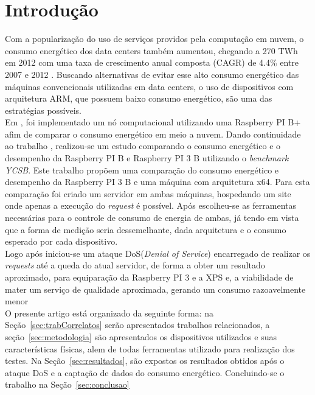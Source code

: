 \documentclass[12pt]{article}
\begin{document}
\section{Introdução}
  Com a popularização do uso de serviços providos pela computação em nuvem, o consumo energético dos data centers também aumentou, chegando a 270 TWh em 2012 com uma taxa de crescimento anual composta (CAGR) de 4.4\% entre 2007 e 2012 \cite{VanHeddeghem:2014:TWI:2657027.2657141}. Buscando alternativas de evitar esse alto consumo energético das máquinas convencionais utilizadas em data centers, o uso de dispositivos com arquitetura ARM, que possuem baixo consumo energético, são uma das estratégias possíveis.\\  
  Em \cite{Joao}, foi implementado um nó computacional utilizando uma Raspberry PI B+ afim de comparar o consumo energético em meio a nuvem.
  Dando continuidade ao trabalho \cite{eu}, realizou-se um estudo comparando o consumo energético e o desempenho da Raspberry PI B e Raspberry PI 3 B utilizando o \textit{benchmark YCSB}. Este trabalho propõem uma comparação do consumo energético e desempenho da Raspberry PI 3 B e uma máquina com arquitetura x64. Para esta comparação foi criado um servidor em ambas máquinas, hospedando um site onde apenas a execução do \textit{request} é possível. Após escolheu-se as ferramentas necessárias para o controle de consumo de energia de ambas, já tendo em vista que a forma de medição seria dessemelhante, dada arquitetura e o consumo esperado por cada dispositivo.\\
  Logo após iniciou-se um ataque DoS(\textit{Denial of Service}) encarregado de realizar os \textit{requests} até a queda do atual servidor, de forma a obter um resultado aproximado, para equiparação da Raspberry PI 3 e a XPS e, a viabilidade de mater um serviço de qualidade aproximada, gerando um consumo razoavelmente menor\\
  O presente artigo está organizado da seguinte forma: na Seção~\ref{sec:trabCorrelatos} serão apresentados trabalhos relacionados, a seção~\ref{sec:metodologia} são apresentados os dispositivos utilizados e suas características físicas, alem de todas ferramentas utilizado para realização dos testes. Na Seção~\ref{sec:resultados}, são expostos os resultados obtidos após o ataque DoS e a captação de dados do consumo energético. Concluindo-se o trabalho na Seção~\ref{sec:conclusao}
\end{document}
